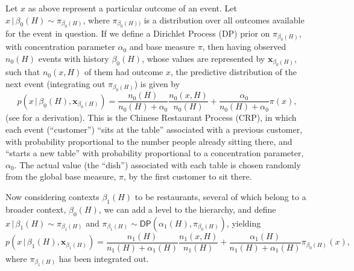 \documentclass[12pt,letterpaper]{report}
\newcommand{\given}{\, \vert \,}
\newcommand{\bx}{\mathbf{x}}
\begin{document}
Let $x$ as above represent a particular outcome of an event.  Let
$x \given \beta_0(H) \sim \pi_{\beta_0(H)}$, where $\pi_{\beta_0(H))}$
is a distribution over all outcomes available for the event in question.  If we
define a Dirichlet Process ({\sf DP}) prior on $\pi_{\beta_0(H)}$, 
with concentration parameter $\alpha_0$ and base measure $\pi$, then having 
observed $n_0(H)$ events with history
$\beta_0(H)$, whose values are represented by $\bx_{\beta_0(H)}$, such that
$n_0(x,H)$ of them had outcome $x$,
the predictive distribution of the next event (integrating out
$\pi_{\beta_0(H)}$) is given by
\begin{equation}
  \label{eq:3}
  p(x\given \beta_0(H), \bx_{\beta_0(H)}) = \frac{n_0(H)}{n_0(H) + \alpha_0}
  \frac{n_0(x,H)}{n_0(H)} + \frac{\alpha_0}{n_0(H) +
    \alpha_0} \pi(x),
\end{equation}
(see \citet{teh2006hierarchical} for a derivation).  This is the Chinese
Restaurant Process ({\sf CRP}), in which each event (``customer'') 
``sits at the table'' associated with a 
previous customer, with probability proportional
to the number people already sitting there, and ``starts a new table'' with 
probability proportional to a concentration parameter, $\alpha_0$.  The
actual value (the ``dish'') associated with each table is chosen
randomly from the global base measure, $\pi$, by the first customer to sit there.

Now considering contexts $\beta_1(H)$ to be restaurants, 
several of which belong to a broader context, $\beta_0(H)$, we can add
a level to the hierarchy, and define $x \given \beta_1(H) \sim \pi_{\beta_1(H)}$ and
$\pi_{\beta_1(H)} \sim \mathsf{DP}(\alpha_1(H), \pi_{\beta_0(H)})$, yielding
\begin{equation}
  \label{eq:4}
  p(x \given \beta_1(H), \bx_{\beta_1(H)}) = \frac{n_1(H)}{n_1(H) +
    \alpha_1(H)} \frac{n_1(x,H)}{n_1(H)} +
  \frac{\alpha_1(H)}{n_1(H) + \alpha_1(H)} \pi_{\beta_0(H)}(x),
\end{equation}
where $\pi_{\beta_1(H)}$ has been integrated out.  
\end{document}
